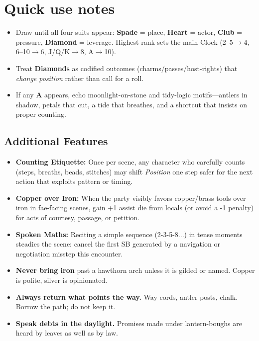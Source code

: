 \section*{Quick use notes}
\label{sec:aelinnel-quick-use}
\begin{itemize}
\item Draw until all four suits appear: \textbf{Spade} = place, \textbf{Heart} = actor, \textbf{Club} = pressure, \textbf{Diamond} = leverage. Highest rank sets the main Clock (2--5$\rightarrow$4, 6--10$\rightarrow$6, J/Q/K$\rightarrow$8, A$\rightarrow$10).
\item Treat \textbf{Diamonds} as codified outcomes (charms/passes/host-rights) that \emph{change position} rather than call for a roll.
\item If any \textbf{A} appears, echo moonlight-on-stone and tidy-logic motifs---antlers in shadow, petals that cut, a tide that breathes, and a shortcut that insists on proper counting.
\end{itemize}

\subsection*{Additional Features}
\begin{itemize}
\item \textbf{Counting Etiquette:} Once per scene, any character who carefully counts (steps, breaths, beads, stitches) may shift \emph{Position} one step safer for the next action that exploits pattern or timing.
\item \textbf{Copper over Iron:} When the party visibly favors copper/brass tools over iron in fae-facing scenes, gain +1 assist die from locals (or avoid a -1 penalty) for acts of courtesy, passage, or petition.
\item \textbf{Spoken Maths:} Reciting a simple sequence (2-3-5-8...) in tense moments steadies the scene: cancel the first SB generated by a navigation or negotiation misstep this encounter.
\end{itemize}

\begin{tcolorbox}[colback=black!3,colframe=black!40!white,title={Courtesies of the Green Gate}]
\begin{itemize}
\item \textbf{Never bring iron} past a hawthorn arch unless it is gilded or named. Copper is polite, silver is opinionated.
\item \textbf{Always return what points the way.} Way-cords, antler-posts, chalk. Borrow the path; do not keep it.
\item \textbf{Speak debts in the daylight.} Promises made under lantern-boughs are heard by leaves as well as by law.
\end{itemize}
\end{tcolorbox}

